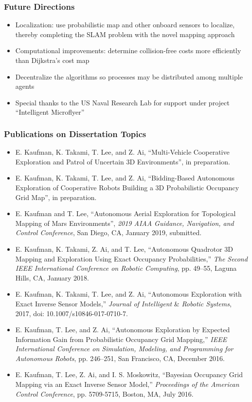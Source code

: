 \documentclass[11pt,professionalfonts,hyperref={pdftex,pdfpagemode=none,pdfstartview=FitH}]{beamer}
\begin{document}
\begin{frame}
\frametitle{Future Directions}
	\begin{itemize}
		\item Localization: use probabilistic map and other onboard sensors to localize, thereby completing the SLAM problem with the novel mapping approach
		\item Computational improvements: determine collision-free costs more efficiently than Dijkstra's cost map
		\item Decentralize the algorithms so processes may be distributed among multiple agents
		\vspace*{0.3cm}
		\item Special thanks to the US Naval Research Lab for support under project ``Intelligent Microflyer''
	\end{itemize}
\end{frame}


\begin{frame}
\frametitle{Publications on Dissertation Topics}
{\tiny 
\begin{itemize}
	\item E. Kaufman, K. Takami, T. Lee, and Z. Ai, ``Multi-Vehicle Cooperative Exploration and Patrol of Uncertain 3D Environments'', in preparation.
	\item E. Kaufman, K. Takami, T. Lee, and Z. Ai, ``Bidding-Based Autonomous Exploration of Cooperative Robots Building a 3D Probabilistic Occupancy Grid Map'', in preparation.
	\item E. Kaufman and T. Lee, ``Autonomous Aerial Exploration for Topological Mapping of Mars Environments'', \textit{2019 AIAA Guidance, Navigation, and Control Conference}, San Diego, CA, January 2019, submitted.
	\item E. Kaufman, K. Takami, Z. Ai, and T. Lee, ``Autonomous Quadrotor 3D Mapping and Exploration Using Exact Occupancy Probabilities,'' \textit{The Second IEEE International Conference on Robotic Computing}, pp. 49--55, Laguna Hills, CA, January 2018.
	\item E. Kaufman, K. Takami, T. Lee, and Z. Ai, ``Autonomous Exploration with Exact Inverse Sensor Models,'' \textit{Journal of Intelligent }\&\textit{ Robotic Systems}, 2017, doi: 10.1007/s10846-017-0710-7.
	\item E. Kaufman, T. Lee, and Z. Ai, ``Autonomous Exploration by Expected Information Gain from Probabilistic Occupancy Grid Mapping,'' \textit{IEEE International Conference on Simulation, Modeling, and Programming for Autonomous Robots}, pp. 246--251, San Francisco, CA, December 2016.
	\item E. Kaufman, T. Lee, Z. Ai, and I. S. Moskowitz, ``Bayesian Occupancy Grid Mapping via an Exact Inverse Sensor Model,'' \textit{Proceedings of the American Control Conference}, pp. 5709-5715, Boston, MA, July 2016.
\end{itemize}
}
\end{frame}
\end{document}

